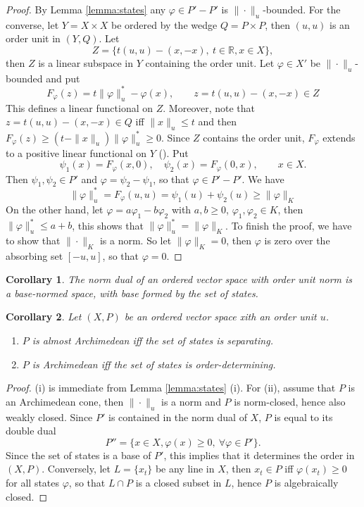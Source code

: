 \documentclass[12pt]{article}
\newtheorem{coro}{Corollary}
\theoremstyle{remark}
\newcommand{\<}{\langle}
\begin{document}
\begin{proof}\cite{ellis} By Lemma \ref{lemma:states}  any $\varphi\in P'-P'$ is $\|\cdot\|_u$-bounded. 
For the converse, let $Y=X\times X$ be ordered by the wedge $Q=P\times P$, then $(u,u)$ is an order unit in $(Y,Q)$.
Let 
\[
Z=\{t(u,u)-(x,-x),\ t\in \mathbb R, x\in X\},
\]
then $Z$ is a linear subspace in $Y$ containing the order unit. 
Let  $\varphi\in X'$ be $\|\cdot\|_u$-bounded and  put 
\[
F_\varphi(z)=t\|\varphi\|_u^*-\varphi(x), \qquad z=t(u,u)-(x,-x)\in Z
\]
This defines a linear functional on $Z$. Moreover, note that $z=t(u,u)-(x,-x)\in Q$ iff $\|x\|_u\le t$ and then $F_\varphi(z)\ge (t-\|x\|_u)\|\varphi\|_u^*\ge 0$.
Since $Z$ contains the order unit, $F_\varphi$ extends to a positive linear functional on $Y$ (\cite[Corollary 1.6.2]{jameson}). Put 
\[
\psi_1(x)=F_\varphi(x,0),\quad \psi_2(x)=F_\varphi(0,x),\qquad x\in X.
\]
Then $\psi_1,\psi_2\in P'$ and $\varphi=\psi_2-\psi_1$, so that $\varphi\in P'-P'$. We have 
\[
\|\varphi\|_u^*=F_\varphi(u,u)= \psi_1(u)+\psi_2(u)\ge \|\varphi\|_K
\]
On the other hand, let $\varphi=a\varphi_1- b\varphi_2$ with $a,b\ge 0$, $\varphi_1,\varphi_2\in K$, then
$\|\varphi\|^*_u\le a+b$, this shows that $\|\varphi\|_u^*=\|\varphi\|_K$. To finish the proof, we have to show that $\|\cdot\|_K$ is a norm. So let $\|\varphi\|_K=0$, then $\varphi$ is zero over the absorbing set $[-u,u]$, so that $\varphi=0$.



\end{proof}

\begin{coro} The norm dual of an ordered vector space with order unit norm is a base-normed space, with base formed by the set of states.

\end{coro}

\begin{coro} Let $(X,P)$ be an ordered vector space xith an order unit $u$. 
\begin{enumerate}
\item[(i)] $P$ is almost Archimedean iff the set of states is separating.
\item[(ii)] $P$ is  Archimedean iff the set of states is order-determining.
\end{enumerate}


\end{coro}


\begin{proof} (i) is immediate from Lemma \ref{lemma:states} (i). For (ii), assume that $P$ is an Archimedean cone, then $\|\cdot\|_u$  is a norm and $P$ is norm-closed, hence also weakly closed. Since $P'$ is contained in the norm dual of $X$, $P$ is equal to its double dual 
\[
P''=\{x\in X, \varphi(x)\ge 0,\ \forall \varphi\in P'\}.
\]
Since the set of states is a base of $P'$, this implies that it determines the order in $(X,P)$. Conversely, let $L=\{x_t\}$ be any line 
in $X$, then $x_t\in P$ iff $\varphi(x_t)\ge 0$ for all states $\varphi$, so that $L\cap P$ is a closed subset in $L$, hence $P$ is algebraically closed.


\end{proof}
\end{document}
